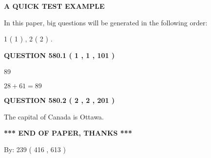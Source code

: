 \documentclass[12pt]{article}
\begin{document}
   
\vspace{0.2in}
   
   
   
   
   
   
 \vspace{0.2in}
{\LARGE {\textbf{ A QUICK TEST EXAMPLE}}}
   
   
   
\vspace{0.2in}
   
In this paper, big questions will be generated in the following order: 
   
   
   1 ( 1 )
 ,
   2 ( 2 )
 .
  
\vspace{0.2in}
  
{\textbf{\Large{QUESTION
580.1 
 ( 1 , 1 , 101 )
}}}
  
  
 
 
\noindent{}

89
 
 
 
 
\noindent{}

$ %
28 +  %
61=   %
89$
 
 
  
\vspace{0.2in}
  
{\textbf{\Large{QUESTION
580.2 
 ( 2 , 2 , 201 )
}}}
  
  
 
 
\noindent{}
 
 
The capital of Canada is Ottawa.
 
 
 
 
   
   
 \vspace{0.2in}
 
   
   
   
   
\vspace{1.0in} 
{\textbf{\large{ *** END OF PAPER, THANKS *** }}} 
   
   
\hspace{1.0in} By: 
 239 ( 416 ,  613 )
   
   
   
\end{document}
